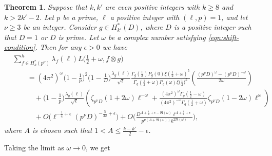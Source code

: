\documentclass[12pt]{amsart}
\theoremstyle{plain}
\newtheorem{thm}{Theorem}[section]
\theoremstyle{definition}
\begin{document}

\begin{thm}\label{thm:first twisted moment}
Suppose that $k, k'$ are even positive integers with $k\geq8$ and $k>2k'-2$. Let $p$ be a prime, $\ell$ a positive integer with $(\ell, p)=1$, and let $\nu\geq 3$ be an integer. Consider $g\in H_{k'}^*(D)$, where  $D$ is a positive integer such that $D=1$ or $D$ is prime. Let $\omega$ be a complex number satisfying \eqref{eqn:shift-condition}.  Then for any $\epsilon>0$ we have
\begin{align*}
&\sum_{f\in H^*_k(p^\nu)}^{h}
    \lambda_f(\ell) L\Big(\frac12+\omega, f\otimes g\Big)\\&\hspace{2em}
    =  \left(4\pi^2\right)^\omega \Big(1-\frac{1}{p}\Big)^2   \Big(1-\frac{1}{D}\Big) \frac{ \lambda_g(\ell)}{\sqrt\ell} 
       \frac{\Gamma_g\left(\frac12\right)P_g(0)\xi\left(\frac12+\omega\right)^5}{\Gamma_g\left(\frac12+\omega\right)P_g(\omega)\xi\big(\frac12\big)^5}  \left(\frac{(p^\nu D)^\omega-(p^\nu D)^{-\omega}}{2\omega}\right) 
     \\&\hspace{3em}+ \Big(1-\frac{1}{p}\Big) \frac{ \lambda_g(\ell)}{\sqrt\ell} \left( 
     \zeta_{p^\nu D} (1+2\omega)\ell^{-\omega}
  +  \frac{(4\pi^2)^{\omega} \Gamma_g(\frac12-\omega)}{(4\pi^2)^{-\omega} \Gamma_g(\frac12+\omega)}     \zeta_{p^\nu D} (1-2\omega)
   \ell^{\omega}\right)\\&\hspace{3em}
   +O\Big( \ell^{-\frac14+\epsilon} (p^\nu D)^{-\frac{5}{32}+\epsilon}\Big)
   +O\bigg( \frac{D^{A+\frac12+\epsilon-\Re(\omega)} \ell^{A+\frac12+\epsilon}  }{p^{\nu(A+\Re(\omega))} k^{2\Re(\omega)}}\bigg),
\end{align*}
where $A$ is chosen such that $1< A \leq \frac{k-k'}{2}-\epsilon$.
\end{thm}
Taking the limit as $\omega\to0$, we get

\end{document}
